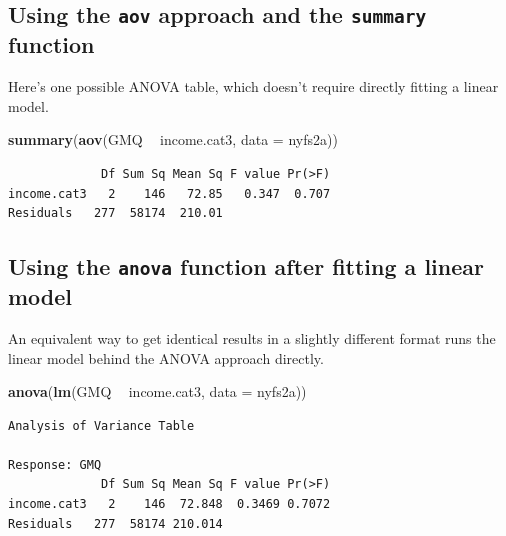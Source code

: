 \documentclass[
]{book}
\newenvironment{Shaded}{\begin{snugshade}}{\end{snugshade}}
\newcommand{\DataTypeTok}[1]{\textcolor[rgb]{0.13,0.29,0.53}{#1}}
\newcommand{\KeywordTok}[1]{\textcolor[rgb]{0.13,0.29,0.53}{\textbf{#1}}}
\newcommand{\NormalTok}[1]{#1}
\newcommand{\OperatorTok}[1]{\textcolor[rgb]{0.81,0.36,0.00}{\textbf{#1}}}
\newcommand{\StringTok}[1]{\textcolor[rgb]{0.31,0.60,0.02}{#1}}
\begin{document}
\hypertarget{using-the-aov-approach-and-the-summary-function}{%
\subsection{\texorpdfstring{Using the \texttt{aov} approach and the \texttt{summary} function}{Using the aov approach and the summary function}}\label{using-the-aov-approach-and-the-summary-function}}

Here's one possible ANOVA table, which doesn't require directly fitting a linear model.

\begin{Shaded}
\begin{Highlighting}[]
\KeywordTok{summary}\NormalTok{(}\KeywordTok{aov}\NormalTok{(GMQ }\OperatorTok{~}\StringTok{ }\NormalTok{income.cat3, }\DataTypeTok{data =}\NormalTok{ nyfs2a))}
\end{Highlighting}
\end{Shaded}

\begin{verbatim}
             Df Sum Sq Mean Sq F value Pr(>F)
income.cat3   2    146   72.85   0.347  0.707
Residuals   277  58174  210.01               
\end{verbatim}

\hypertarget{using-the-anova-function-after-fitting-a-linear-model}{%
\subsection{\texorpdfstring{Using the \texttt{anova} function after fitting a linear model}{Using the anova function after fitting a linear model}}\label{using-the-anova-function-after-fitting-a-linear-model}}

An equivalent way to get identical results in a slightly different format runs the linear model behind the ANOVA approach directly.

\begin{Shaded}
\begin{Highlighting}[]
\KeywordTok{anova}\NormalTok{(}\KeywordTok{lm}\NormalTok{(GMQ }\OperatorTok{~}\StringTok{ }\NormalTok{income.cat3, }\DataTypeTok{data =}\NormalTok{ nyfs2a))}
\end{Highlighting}
\end{Shaded}

\begin{verbatim}
Analysis of Variance Table

Response: GMQ
             Df Sum Sq Mean Sq F value Pr(>F)
income.cat3   2    146  72.848  0.3469 0.7072
Residuals   277  58174 210.014               
\end{verbatim}
\end{document}
